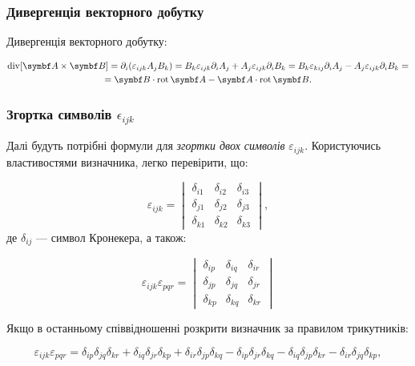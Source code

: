 \subsubsection{Дивергенція векторного добутку}

Дивергенція векторного добутку:

\begin{multline*}
\Div[\vect{A} \times \Bfield] = \partial_i (\varepsilon_{ijk} A_j B_k) = B_k \varepsilon_{ijk} \partial_i A_j + A_j \varepsilon_{ijk} \partial_i B_k =
B_k \varepsilon_{kij} \partial_i A_j - A_j \varepsilon_{ijk} \partial_i B_k = \\ = \Bfield \cdot \Rot \vect{A} - \vect{A} \cdot \Rot \Bfield.
\end{multline*}

\subsubsection{Згортка символів \texorpdfstring{\(\epsilon_{ijk}\)}{}}

Далі будуть потрібні формули для \emph{згортки двох символів} \(\varepsilon_{ijk}\). Користуючись властивостями визначника, легко перевірити, що:

\begin{equation*}
\varepsilon_{ijk} =
\begin{vmatrix}
\delta_{i1} & \delta_{i2} & \delta_{i3} \\
\delta_{j1} & \delta_{j2} & \delta_{j3} \\
\delta_{k1} & \delta_{k2} & \delta_{k3}
\end{vmatrix},
\end{equation*}
%
де \(\delta_{ij}\) --- символ Кронекера, а також:

\begin{equation*}
\varepsilon_{ijk} \varepsilon_{pqr} =
\begin{vmatrix}
\delta_{ip} & \delta_{iq} & \delta_{ir} \\
\delta_{jp} & \delta_{jq} & \delta_{jr} \\
\delta_{kp} & \delta_{kq} & \delta_{kr}
\end{vmatrix}
\end{equation*}

Якщо в останньому співвідношенні розкрити визначник за правилом трикутників:

\begin{equation*}
\varepsilon_{ijk} \varepsilon_{pqr} = \delta_{ip} \delta_{jq} \delta_{kr} + \delta_{iq} \delta_{jr} \delta_{kp} + \delta_{ir} \delta_{jp} \delta_{kq} -
\delta_{ip} \delta_{jr} \delta_{kq} - \delta_{iq} \delta_{jp} \delta_{kr} - \delta_{ir} \delta_{jq} \delta_{kp},
\end{equation*}

